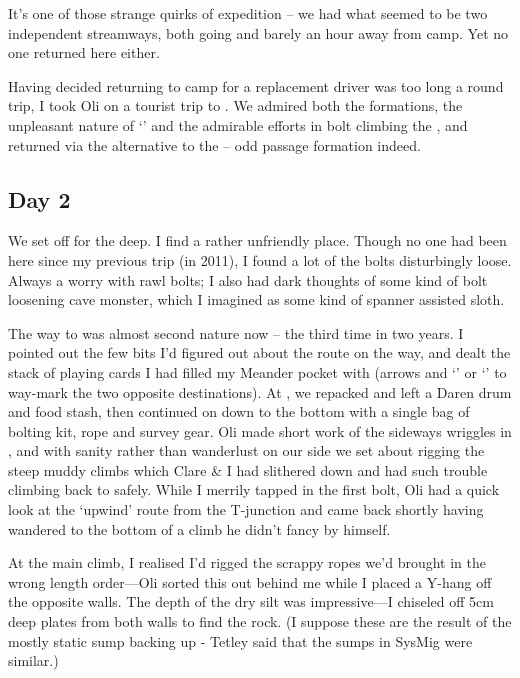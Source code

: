 It's one of those strange quirks of expedition -- we had what seemed to
be two independent streamways, both going and barely an hour away from
camp. Yet no one returned here either.

Having decided returning to camp for a replacement driver was too long a
round trip, I took Oli on a tourist trip to .
We admired both the formations, the unpleasant nature of
`' and the admirable efforts in bolt climbing the
, and returned via the  alternative to
the  -- odd passage formation indeed.


\subsection{Day 2}

We set off for the deep. I find  a rather unfriendly place.
Though no one had been here since my previous trip (in 2011), I found a
lot of the bolts disturbingly loose. Always a worry with rawl bolts; I
also had dark thoughts of some kind of bolt loosening cave monster,
which I imagined as some kind of spanner assisted sloth.

The way to  was almost second nature now -- the third time in two
years. I pointed out the few bits I'd figured out about the route on the
way, and dealt the stack of playing cards I had filled my Meander pocket
with (arrows and `' or `' to way-mark the two opposite
destinations). At , we repacked and left a Daren drum and food
stash, then continued on down to the bottom with a single bag of bolting
kit, rope and survey gear. Oli made short work of the sideways wriggles
in , and with sanity rather than wanderlust on our
side we set about rigging the steep muddy climbs which Clare \& I had
slithered down and had such trouble climbing back to safely. While I merrily tapped in
the first bolt, Oli had a quick look at the `upwind' route from the
T-junction and came back shortly having wandered to the bottom of a
climb he didn't fancy by himself.

At the main climb, I realised I'd rigged the scrappy ropes we'd brought
in the wrong length order---Oli sorted this out behind me while I
placed a Y-hang off the opposite walls. The depth of the dry silt was
impressive---I chiseled off 5cm deep plates from both walls to find the
rock. (I suppose these are the result of the mostly static sump backing up - Tetley said that the sumps in SysMig were similar.)


